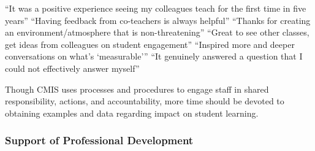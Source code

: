 \begin{findings}
``It was a positive experience seeing my colleagues teach for the first time in five years”
``Having feedback from co-teachers is always helpful''
``Thanks for creating an environment/atmosphere that is non-threatening''
``Great to see other classes, get ideas from colleagues on student engagement''
``Inspired more and deeper conversations on what’s ‘measurable’''
``It genuinely answered a question that I could not effectively answer myself'' 


Though CMIS uses processes and procedures to engage staff in shared responsibility, actions, and accountability, more time should be devoted to obtaining examples and data regarding impact on student learning.
\end{findings}

\subsubsection{Support of Professional Development}



